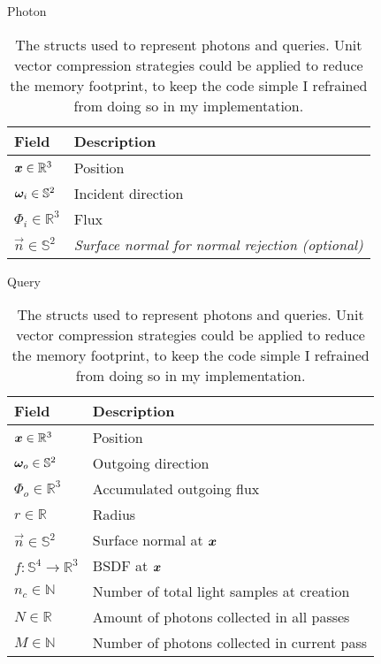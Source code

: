 \begin{table}
    \centering
    \begin{subtable}{.45\textwidth}
        \caption{Photon}
        \label{tab:photon_struct}
        \begin{tabular}{l p{4cm}}
            \textbf{Field} & \textbf{Description} \\
            \midrule
            $\bm{x} \in \mathbb{R}^3$ & Position \\
            ${\bm{\omega}_i} \in \mathbb{S}^2$ & Incident direction \\
            $\Phi_i \in \mathbb{R}^3$ & Flux \\
            $\vec{n} \in \mathbb{S}^2$ & \emph{Surface normal for normal rejection (optional)} \\
        \end{tabular}
    \end{subtable}%
    \begin{subtable}{.55\textwidth}
        \caption{Query}
        \label{tab:query_struct}
        \begin{tabular}{l p{5.5cm}}
            \textbf{Field} & \textbf{Description} \\
            \midrule
            $\bm{x} \in \mathbb{R}^3$ & Position \\
            ${\bm{\omega}_o} \in \mathbb{S}^2$ & Outgoing direction \\
            $\Phi_o \in \mathbb{R}^3$ & Accumulated outgoing flux \\
            $r \in \mathbb{R}$ & Radius \\
            $\vec{n} \in \mathbb{S}^2$ & Surface normal at $\bm{x}$ \\
            $f : \mathbb{S}^4 \to \mathbb{R}^3$ & BSDF at $\bm{x}$ \\
            $n_c \in \mathbb{N}$ & Number of total light samples at creation \\
            $N \in \mathbb{R}$ & Amount of photons collected in all passes \\
            $M \in \mathbb{N}$ & Number of photons collected in current pass \\
        \end{tabular}
    \end{subtable}
    \caption{The structs used to represent photons and queries. Unit vector compression strategies \parencite{cigolle2014} could be applied to reduce the memory footprint, to keep the code simple I refrained from doing so in my implementation.}
\end{table}

